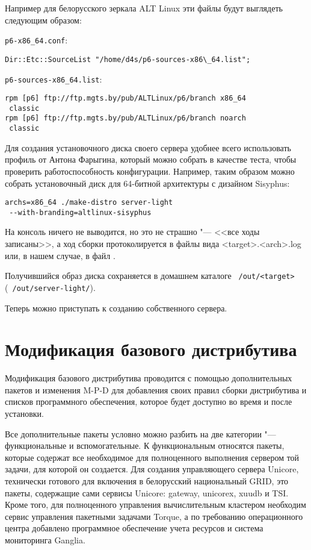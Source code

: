 \documentclass[10pt, a5paper]{article}
\begin{document}
Например для белорусского зеркала ALT Linux эти файлы будут выглядеть следующим образом:

{\tt p6-x86\_64.conf}:
\begin{verbatim}
Dir::Etc::SourceList "/home/d4s/p6-sources-x86\_64.list";
\end{verbatim}

{\tt p6-sources-x86\_64.list}:
\begin{verbatim}
rpm [p6] ftp://ftp.mgts.by/pub/ALTLinux/p6/branch x86_64
 classic
rpm [p6] ftp://ftp.mgts.by/pub/ALTLinux/p6/branch noarch
 classic
\end{verbatim}

Для создания установочного диска своего сервера удобнее всего использовать 
профиль от Антона Фарыгина, который можно собрать в качестве теста, 
чтобы проверить работоспособность конфигурации. 
Например, таким образом можно собрать установочный диск для 64-битной 
архитектуры с дизайном Sisyphus:
\begin{verbatim}
archs=x86_64 ./make-distro server-light
 --with-branding=altlinux-sisyphus
\end{verbatim}

На консоль ничего не выводится, но это не страшно "--- <<все ходы записаны>>, 
а ход сборки протоколируется в файлы вида \linebreak <target>.<arch>.log или, в нашем 
случае, в файл .

Получившийся образ диска сохраняется в домашнем каталоге {\tt ~/out/<target>} ({\tt ~/out/server-light/}).

Теперь можно приступать к созданию собственного сервера.

\section*{Модификация базового дистрибутива}
Модификация базового дистрибутива проводится с помощью дополнительных пакетов 
и изменения M-P-D для добавления своих правил сборки дистрибутива и 
списков программного обеспечения, которое будет доступно во время и после установки.

Все дополнительные пакеты условно можно разбить на две категории "--- функциональные и вспомогательные. 
К функциональным относятся пакеты, которые содержат все необходимое для 
полноценного выполнения сервером той задачи, для которой он создается.
Для создания управляющего сервера Unicore, технически готового для включения 
в белорусский национальный GRID, это пакеты, содержащие сами сервисы Unicore: 
gateway, unicorex, xuudb и TSI. 
Кроме того, для полноценного управления вычислительным кластером необходим сервис 
управления пакетными задачами Torque, а по требованию операционного центра 
добавлено программное обеспечение учета ресурсов и система мониторинга Ganglia.
\end{document}
